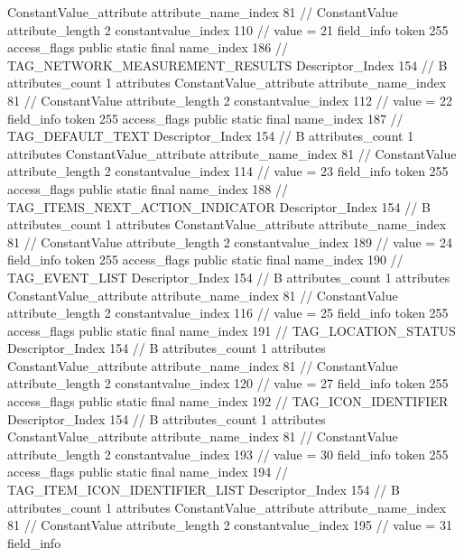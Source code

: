 {{{{{{				ConstantValue_attribute {
					attribute_name_index	81		// ConstantValue
					attribute_length	2
					constantvalue_index	110		// value = 21
				}
				}
			}
			field_info {
				token	255
				access_flags	public static final
				name_index	186		// TAG_NETWORK_MEASUREMENT_RESULTS
				Descriptor_Index	154		// B
				attributes_count	1
				attributes {
				ConstantValue_attribute {
					attribute_name_index	81		// ConstantValue
					attribute_length	2
					constantvalue_index	112		// value = 22
				}
				}
			}
			field_info {
				token	255
				access_flags	public static final
				name_index	187		// TAG_DEFAULT_TEXT
				Descriptor_Index	154		// B
				attributes_count	1
				attributes {
				ConstantValue_attribute {
					attribute_name_index	81		// ConstantValue
					attribute_length	2
					constantvalue_index	114		// value = 23
				}
				}
			}
			field_info {
				token	255
				access_flags	public static final
				name_index	188		// TAG_ITEMS_NEXT_ACTION_INDICATOR
				Descriptor_Index	154		// B
				attributes_count	1
				attributes {
				ConstantValue_attribute {
					attribute_name_index	81		// ConstantValue
					attribute_length	2
					constantvalue_index	189		// value = 24
				}
				}
			}
			field_info {
				token	255
				access_flags	public static final
				name_index	190		// TAG_EVENT_LIST
				Descriptor_Index	154		// B
				attributes_count	1
				attributes {
				ConstantValue_attribute {
					attribute_name_index	81		// ConstantValue
					attribute_length	2
					constantvalue_index	116		// value = 25
				}
				}
			}
			field_info {
				token	255
				access_flags	public static final
				name_index	191		// TAG_LOCATION_STATUS
				Descriptor_Index	154		// B
				attributes_count	1
				attributes {
				ConstantValue_attribute {
					attribute_name_index	81		// ConstantValue
					attribute_length	2
					constantvalue_index	120		// value = 27
				}
				}
			}
			field_info {
				token	255
				access_flags	public static final
				name_index	192		// TAG_ICON_IDENTIFIER
				Descriptor_Index	154		// B
				attributes_count	1
				attributes {
				ConstantValue_attribute {
					attribute_name_index	81		// ConstantValue
					attribute_length	2
					constantvalue_index	193		// value = 30
				}
				}
			}
			field_info {
				token	255
				access_flags	public static final
				name_index	194		// TAG_ITEM_ICON_IDENTIFIER_LIST
				Descriptor_Index	154		// B
				attributes_count	1
				attributes {
				ConstantValue_attribute {
					attribute_name_index	81		// ConstantValue
					attribute_length	2
					constantvalue_index	195		// value = 31
				}
				}
			}
			field_info {
}}}}}
